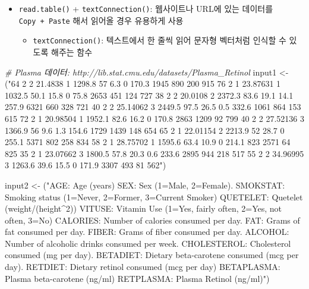 \documentclass[
  11pt,
]{krantz}
\newenvironment{Shaded}{\begin{snugshade}}{\end{snugshade}}
\newcommand{\CommentTok}[1]{\textcolor[rgb]{0.37,0.37,0.37}{\textit{#1}}}
\newcommand{\NormalTok}[1]{#1}
\newcommand{\StringTok}[1]{\textcolor[rgb]{0.5,0.5,0.5}{#1}}
\providecommand{\tightlist}{%
  \setlength{\itemsep}{0pt}\setlength{\parskip}{0pt}}
\begin{document}
\normalsize

\begin{itemize}
\tightlist
\item
  \texttt{read.table()} + \texttt{textConnection()}: 웹사이트나 URL에 있는 데이터를 \texttt{Copy\ +\ Paste} 해서 읽어올 경우 유용하게 사용

  \begin{itemize}
  \tightlist
  \item
    \texttt{textConnection()}: 텍스트에서 한 줄씩 읽어 문자형 벡터처럼 인식할 수 있도록 해주는 함수
  \end{itemize}
\end{itemize}

\footnotesize

\begin{Shaded}
\begin{Highlighting}[]
\CommentTok{# Plasma 데이터: http://lib.stat.cmu.edu/datasets/Plasma_Retinol }
\NormalTok{input1 <-}\StringTok{ }\NormalTok{(}\StringTok{"64  2   2   21.4838 1   1298.8  57  6.3 0   170.3   1945    890 200 915}
\StringTok{76  2   1   23.87631    1   1032.5  50.1    15.8    0   75.8    2653    451 124 727}
\StringTok{38  2   2   20.0108 2   2372.3  83.6    19.1    14.1    257.9   6321    660 328 721}
\StringTok{40  2   2   25.14062    3   2449.5  97.5    26.5    0.5 332.6   1061    864 153 615}
\StringTok{72  2   1   20.98504    1   1952.1  82.6    16.2    0   170.8   2863    1209    92  799}
\StringTok{40  2   2   27.52136    3   1366.9  56  9.6 1.3 154.6   1729    1439    148 654}
\StringTok{65  2   1   22.01154    2   2213.9  52  28.7    0   255.1   5371    802 258 834}
\StringTok{58  2   1   28.75702    1   1595.6  63.4    10.9    0   214.1   823 2571    64  825}
\StringTok{35  2   1   23.07662    3   1800.5  57.8    20.3    0.6 233.6   2895    944 218 517}
\StringTok{55  2   2   34.96995    3   1263.6  39.6    15.5    0   171.9   3307    493 81  562"}\NormalTok{)}

\NormalTok{input2 <-}\StringTok{ }\NormalTok{(}\StringTok{"AGE: Age (years)}
\StringTok{    SEX: Sex (1=Male, 2=Female).}
\StringTok{    SMOKSTAT: Smoking status (1=Never, 2=Former, 3=Current Smoker)}
\StringTok{    QUETELET: Quetelet (weight/(height^2))}
\StringTok{    VITUSE: Vitamin Use (1=Yes, fairly often, 2=Yes, not often, 3=No)}
\StringTok{    CALORIES: Number of calories consumed per day.}
\StringTok{    FAT: Grams of fat consumed per day.}
\StringTok{    FIBER: Grams of fiber consumed per day.}
\StringTok{    ALCOHOL: Number of alcoholic drinks consumed per week.}
\StringTok{    CHOLESTEROL: Cholesterol consumed (mg per day).}
\StringTok{    BETADIET: Dietary beta-carotene consumed (mcg per day).}
\StringTok{    RETDIET: Dietary retinol consumed (mcg per day)}
\StringTok{    BETAPLASMA: Plasma beta-carotene (ng/ml)}
\StringTok{    RETPLASMA: Plasma Retinol (ng/ml)"}\NormalTok{)}


\end{Highlighting}
\end{Shaded}
\end{document}
